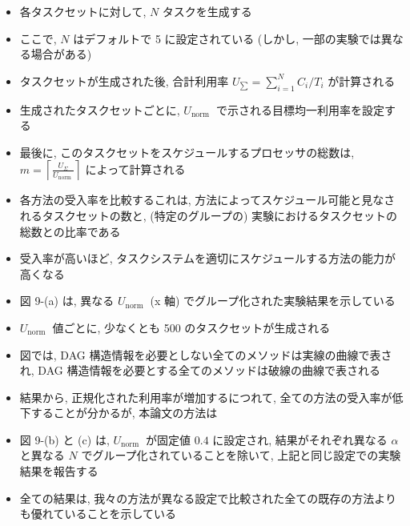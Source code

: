 \begin{frame}{}
    \begin{itemize}
        \item 各タスクセットに対して, $N$ タスクを生成する
\item ここで, $N$ はデフォルトで 5 に設定されている (しかし, 一部の実験では異なる場合がある)
\item タスクセットが生成された後, 合計利用率 $U_{\sum}=\sum_{i=1}^{N} C_{i} / T_{i}$ が計算される
\item 生成されたタスクセットごとに, $U_{\text {norm }}$ で示される目標均一利用率を設定する
\item 最後に, このタスクセットをスケジュールするプロセッサの総数は, $m=\left\lceil\frac{U_{\Sigma}}{U_{\text {norm }}}\right\rceil$ によって計算される
\item 各方法の受入率を比較するこれは, 方法によってスケジュール可能と見なされるタスクセットの数と, (特定のグループの) 実験におけるタスクセットの総数との比率である
\item 受入率が高いほど, タスクシステムを適切にスケジュールする方法の能力が高くなる
    \end{itemize}
\end{frame}

\begin{frame}{}
    \begin{itemize}
        \item 図 9-(a) は, 異なる $U_{\text {norm }}$ (x 軸) でグループ化された実験結果を示している
\item $U_{\text {norm }}$ 値ごとに, 少なくとも 500 のタスクセットが生成される
\item 図では, DAG 構造情報を必要としない全てのメソッドは実線の曲線で表され, DAG 構造情報を必要とする全てのメソッドは破線の曲線で表される
\item 結果から, 正規化された利用率が増加するにつれて, 全ての方法の受入率が低下することが分かるが, 本論文の方法は
    \end{itemize}
\end{frame}

\begin{frame}{}
    \begin{itemize}
        \item 図 9-(b) と (c) は, $U_{\text {norm }}$ が固定値 $0.4$ に設定され, 結果がそれぞれ異なる $\alpha$ と異なる $N$ でグループ化されていることを除いて, 上記と同じ設定での実験結果を報告する
\item 全ての結果は, 我々の方法が異なる設定で比較された全ての既存の方法よりも優れていることを示している
    \end{itemize}
\end{frame}

